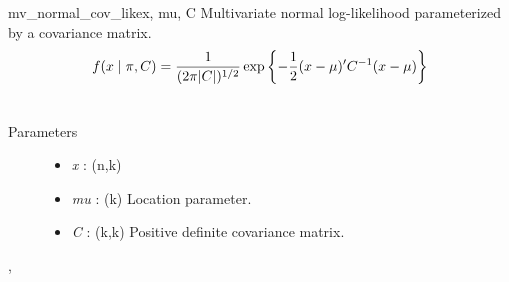 \hypertarget{pymc.distributions.mv_normal_cov_like}{}\begin{funcdesc}{mv\_normal\_cov\_like}{x, mu, C}
Multivariate normal log-likelihood parameterized by a covariance 
matrix.
\begin{gather}
\begin{split}f(x \mid \pi, C) = \frac{1}{(2\pi|C|)^{1/2}} \exp\left\{ -\frac{1}{2} (x-\mu)^{\prime}C^{-1}(x-\mu) \right\}\end{split}\notag\\\begin{split}\end{split}\notag
\end{gather}\begin{description}
\item[Parameters] \leavevmode\begin{itemize}
\item {} 
\emph{x} : (n,k)

\item {} 
\emph{mu} : (k) Location parameter.

\item {} 
\emph{C} : (k,k) Positive definite covariance matrix.

\end{itemize}

\end{description}




\hyperlink{pymc.distributions.mv_normal_like}{}, \hyperlink{pymc.distributions.mv_normal_chol_like}{}


\end{funcdesc}

